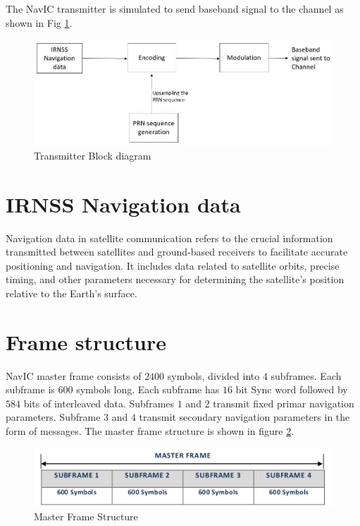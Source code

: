 The NavIC transmitter is simulated to send baseband signal to the channel as shown in Fig \ref{fig:trans_flow}. 

\begin{figure}[ht]
\centering
\includegraphics[width=1\columnwidth]{figs/trans_flow.jpg}
\centering
\captionsetup{justification=centering}
\caption{Transmitter Block diagram}
\label{fig:trans_flow}
\end{figure}

\section{IRNSS Navigation data}
Navigation data in satellite communication refers to the crucial information transmitted between satellites and ground-based receivers to facilitate accurate positioning and navigation. It includes data related to satellite orbits, precise timing, and other parameters necessary for determining the satellite's position relative to the Earth's surface.
\section{Frame structure}
NavIC master frame consists of $2400$ symbols, divided into $4$ subframes. Each subframe is $600$ symbols long. Each subframe has $16$ bit Sync word followed by $584$ bits of interleaved data. Subframes $1$ and $2$ transmit fixed primar navigation parameters. Subframe $3$ and $4$ transmit secondary navigation parameters in the form of messages. The master frame structure is shown in figure \ref{fig:master_frame}. 

\begin{figure}[ht]
\centering
\includegraphics[width=0.8\columnwidth]{figs/master_frame.png}
\centering
\captionsetup{justification=centering}
\caption{Master Frame Structure}
\label{fig:master_frame}
\end{figure}

